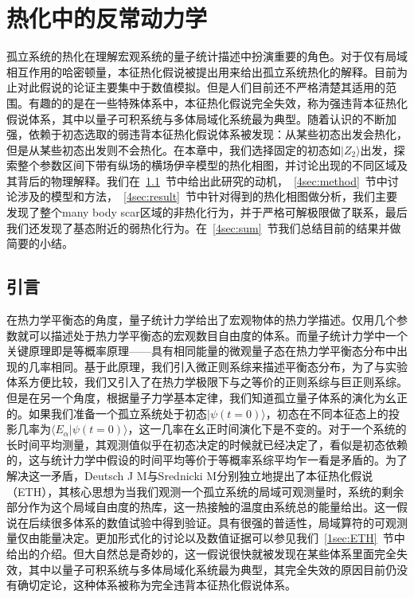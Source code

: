 \chapter{热化中的反常动力学}\label{chap:ETH}

孤立系统的热化在理解宏观系统的量子统计描述中扮演重要的角色。对于仅有局域相互作用的哈密顿量，本征热化假说被提出用来给出孤立系统热化的解释。目前为止对此假说的论证主要集中于数值模拟。但是人们目前还不严格清楚其适用的范围。有趣的的是在一些特殊体系中，本征热化假说完全失效，称为强违背本征热化假说体系，其中以量子可积系统与多体局域化系统最为典型。随着认识的不断加强，依赖于初态选取的弱违背本征热化假说体系被发现：从某些初态出发会热化，但是从某些初态出发则不会热化。在本章中，我们选择固定的初态如$|Z_2\rangle$出发，探索整个参数区间下带有纵场的横场伊辛模型的热化相图，并讨论出现的不同区域及其背后的物理解释。我们在~\ref{4sec:intro}~节中给出此研究的动机，~\ref{4sec:method}~节中讨论涉及的模型和方法，~\ref{4sec:result}~节中针对得到的热化相图做分析，我们主要发现了整个many body scar区域的非热化行为，并于严格可解极限做了联系，最后我们还发现了基态附近的弱热化行为。在~\ref{4sec:sum}~节我们总结目前的结果并做简要的小结。

\section{引言}\label{4sec:intro}
在热力学平衡态的角度，量子统计力学给出了宏观物体的热力学描述。仅用几个参数就可以描述处于热力学平衡态的宏观数目自由度的体系。而量子统计力学中一个关键原理即是等概率原理——具有相同能量的微观量子态在热力学平衡态分布中出现的几率相同。基于此原理，我们引入微正则系综来描述平衡态分布，为了与实验体系方便比较，我们又引入了在热力学极限下与之等价的正则系综与巨正则系综。但是在另一个角度，根据量子力学基本定律，我们知道孤立量子体系的演化为幺正的。如果我们准备一个孤立系统处于初态$|\psi(t=0)\rangle$，初态在不同本征态上的投影几率为$\langle E_\alpha|\psi(t=0)\rangle$，这一几率在幺正时间演化下是不变的。对于一个系统的长时间平均测量，其观测值似乎在初态决定的时候就已经决定了，看似是初态依赖的，这与统计力学中假设的时间平均等价于等概率系综平均乍一看是矛盾的。为了解决这一矛盾，Deutsch J M\cite{Deutsch1991quantum}与Srednicki M\cite{Srednicki1994chaos}分别独立地提出了本征热化假说（ETH），其核心思想为当我们观测一个孤立系统的局域可观测量时，系统的剩余部分作为这个局域自由度的热库，这一热接触的温度由系统总的能量给出。这一假说在后续很多体系的数值试验中得到验证。具有很强的普适性，局域算符的可观测量仅由能量决定。更加形式化的讨论以及数值证据可以参见我们~\ref{1sec:ETH}~节中给出的介绍。但大自然总是奇妙的，这一假说很快就被发现在某些体系里面完全失效，其中以量子可积系统\cite{kinoshita2006quantum,Rigol2007Relaxation,Calabrese2011Quantum,essler2016quench,vidmar2016generalized}与多体局域化系统最为典型\cite{basko2006metal,Serbyn2013local,Huse2014Phenomenology}，其完全失效的原因目前仍没有确切定论，这种体系被称为完全违背本征热化假说体系。

